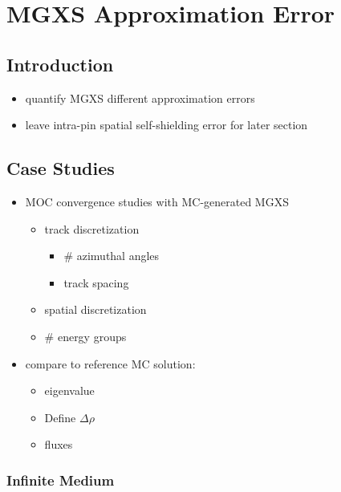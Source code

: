 \chapter{MGXS Approximation Error}
\label{chap:mgxs-approx-error}

\section{Introduction}
\label{sec:chap4-intro}

\begin{itemize}
  \item quantify \ac{MGXS} different approximation errors
  \item leave intra-pin spatial self-shielding error for later section
\end{itemize}


\section{Case Studies}
\label{sec:chap4-case-studies}

\begin{itemize}
  \item \ac{MOC} convergence studies with \ac{MC}-generated \ac{MGXS}
  \begin{itemize}
    \item track discretization
    \begin{itemize}
      \item \# azimuthal angles
      \item track spacing
    \end{itemize}
    \item spatial discretization
    \item \# energy groups  
  \end{itemize}
  \item compare to reference \ac{MC} solution:
  \begin{itemize}
    \item eigenvalue
	\item Define $\Delta\rho$
    \item fluxes
  \end{itemize}
\end{itemize}

\subsection{Infinite Medium}
\label{subsec:chap4-inf-medium}


